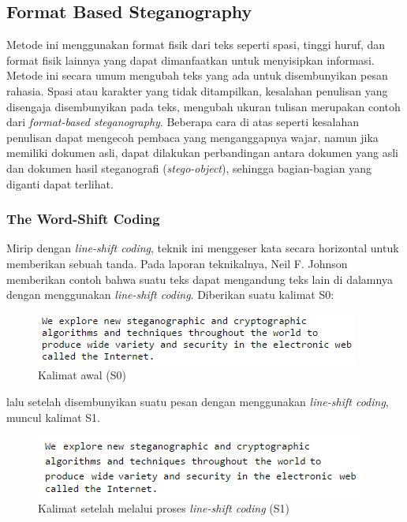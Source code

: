 \subsection{Format Based Steganography\cite{fbs:2009}}
\label{sec:fb_stegano}

Metode ini menggunakan format fisik dari teks seperti spasi, tinggi huruf, dan format fisik lainnya yang dapat dimanfaatkan untuk menyisipkan informasi. Metode ini secara umum mengubah teks yang ada untuk disembunyikan pesan rahasia. Spasi atau karakter yang tidak ditampilkan, kesalahan penulisan yang disengaja disembunyikan pada teks, mengubah ukuran tulisan merupakan contoh dari \textit{format-based steganography}. Beberapa cara di atas seperti kesalahan penulisan dapat mengecoh pembaca yang menganggapnya wajar, namun jika memiliki dokumen asli, dapat dilakukan perbandingan antara dokumen yang asli dan dokumen hasil steganografi (\textit{stego-object}), sehingga bagian-bagian yang diganti dapat terlihat.

\subsubsection{The Word-Shift Coding}

Mirip dengan \textit{line-shift coding}, teknik ini menggeser kata secara horizontal untuk memberikan sebuah tanda. Pada laporan teknikalnya, Neil F. Johnson memberikan contoh bahwa suatu teks dapat mengandung teks lain di dalamnya dengan menggunakan \textit{line-shift coding}\cite{Neil:1995}. Diberikan suatu kalimat S0:
\begin{figure}[H]
	\centering
	\includegraphics[scale=0.8]{Gambar/S0}
	\caption{Kalimat awal (S0)} 
\end{figure}

lalu setelah disembunyikan suatu pesan dengan menggunakan \textit{line-shift coding}, muncul kalimat S1.

\begin{figure}[H]
	\centering
	\includegraphics[scale=0.8]{Gambar/S1}
	\caption{Kalimat setelah melalui proses \textit{line-shift coding} (S1)}
\end{figure}

